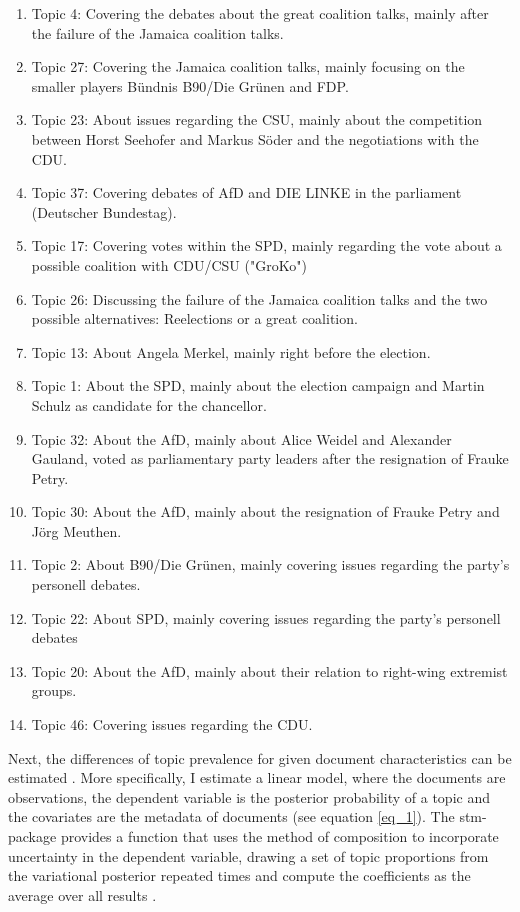 \documentclass[12pt,a4paper,notitlepage]{article}
\begin{document}
\begin{enumerate}
	\item Topic 4: Covering the debates about the great coalition talks, mainly after the failure of the Jamaica coalition talks. 
	\item Topic 27: Covering the Jamaica coalition talks, mainly focusing on the smaller players Bündnis B90/Die Grünen and FDP.
	\item Topic 23: About issues regarding the CSU, mainly about the competition between Horst Seehofer and Markus Söder and the negotiations with the CDU.
	\item Topic 37: Covering debates of AfD and DIE LINKE in the parliament (Deutscher Bundestag).
	\item Topic 17: Covering votes within the SPD, mainly regarding the vote about a possible coalition with CDU/CSU ("GroKo")
	\item Topic 26: Discussing the failure of the Jamaica coalition talks and the two possible alternatives: Reelections or a great coalition.
	\item Topic 13: About Angela Merkel, mainly right before the election.
	\item Topic 1: About the SPD, mainly about the election campaign and Martin Schulz as candidate for the chancellor.
	\item Topic 32: About the AfD, mainly about Alice Weidel and Alexander Gauland, voted as parliamentary party leaders after the resignation of Frauke Petry.
	\item Topic 30: About the AfD, mainly about the resignation of Frauke Petry and Jörg Meuthen.
	\item Topic 2: About B90/Die Grünen, mainly covering issues regarding the party's personell debates.
	\item Topic 22: About SPD, mainly covering issues regarding the party's personell debates
	\item Topic 20: About the AfD, mainly about their relation to right-wing extremist groups.
	\item Topic 46: Covering issues regarding the CDU.
\end{enumerate}   

Next, the differences of topic prevalence for given document characteristics can be estimated \citep{roberts_model_2016}. More specifically, I estimate a linear model, where the documents are observations, the dependent variable is the posterior probability of a topic and the covariates are the metadata of documents (see equation \ref{eq_1}). The stm-package provides a function that uses the method of composition to incorporate uncertainty in the dependent variable, drawing a set of topic proportions from the variational posterior repeated times and compute the coefficients as the average over all results \citep{roberts_stm:_2016}.
\end{document}
